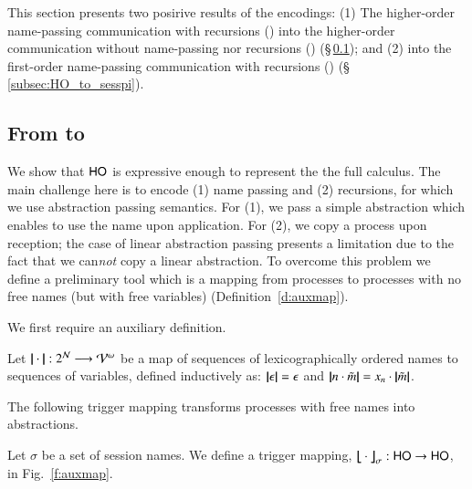 \noi This section presents two posirive results of the encodings:
(1) The higher-order name-passing communication with recursions (\HOp) into 
the higher-order communication without name-passing nor 
recursions (\HO) (\S\,\ref{subsec:HOpi_to_HO}); and (2) 
\HOp into the first-order name-passing communication
with recursions (\sessp) (\S\,\ref{subsec:HO_to_sesspi}). 

\subsection{From \HOp to \HO}
\label{subsec:HOpi_to_HO}
\noi We show that $\mathsf{HO}$ is expressive enough to
represent the the full \HOp calculus.
The main challenge here is to encode (1) name passing 
and (2) recursions, 
for which 
we use abstraction passing semantics. For (1), we pass  
a simple abstraction which enables to use the name upon application. 
For (2), we 
copy a process upon reception; the case of linear abstraction passing
presents a limitation due to the fact that we can{\em not} 
copy a linear abstraction.
To overcome this problem we define a preliminary tool which is a mapping from
processes to processes with no free names (but with free variables) (Definition~\ref{d:auxmap}). 

We first require an auxiliary definition.

\smallskip 

\begin{definition}\rm 
\label{def:hop_to_ho}
	Let $|\!|\cdot|\!|: 2^{\mathcal{N}} \longrightarrow \mathcal{V}^\omega$
	be a map of sequences of 
lexicographically ordered names to sequences of variables, defined
	inductively as: 
	$|\!|\epsilon|\!| = \epsilon$ and $|\!|n \cdot \tilde{m}|\!| = x_n \cdot |\!|\tilde{m}|\!|$. 
\end{definition}

\smallskip 

\noi The following trigger mapping transforms processes
with free names into abstractions. 

\smallskip 

\begin{definition} \label{d:trabs}\label{d:auxmap}
	Let $\sigma$ be a set of session names.
	We define a trigger mapping,  
$\big\lfloor\!\!\big\lfloor\cdot\big\rfloor\!\!\big\rfloor^{}_\sigma: \mathsf{HO} \to \mathsf{HO}$, in Fig.~\ref{f:auxmap}.
\end{definition}

